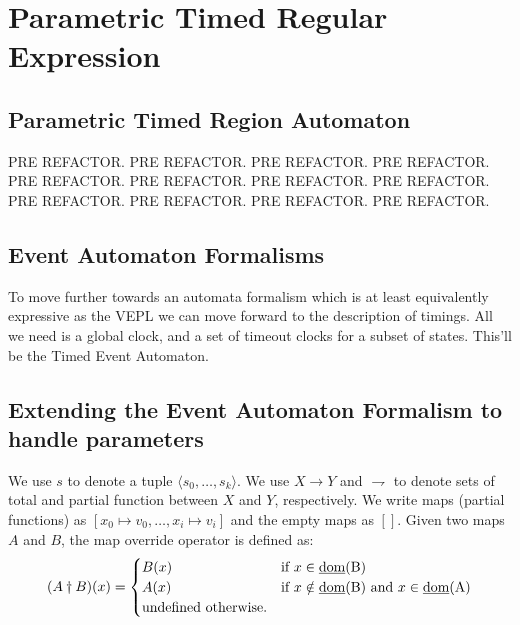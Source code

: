 	\section{Parametric Timed Regular Expression}
	
		\subsection{Parametric Timed Region Automaton}
					
			
		
		PRE REFACTOR. PRE REFACTOR. PRE REFACTOR. PRE REFACTOR. PRE REFACTOR. PRE REFACTOR. PRE REFACTOR. PRE REFACTOR. PRE REFACTOR. PRE REFACTOR. PRE REFACTOR. PRE REFACTOR. 

				
		\subsection{Event Automaton Formalisms}
		
			
			

			
			To move further towards an automata formalism which is at least equivalently expressive as the VEPL
			we can move forward to the description of timings. All we need is a global clock, and a set of timeout 
			clocks for a subset of states. This'll be the Timed Event Automaton.
		

		

			
		\subsection{Extending the Event Automaton Formalism to handle parameters}
			
		
			
			We use $s$ to denote a tuple $\langle s_0,\dots,s_k \rangle$. We use $X \rightarrow Y$ and $\rightharpoondown$ to denote sets of total and partial function between
			$X$ and $Y$, respectively. We write maps (partial functions) as $[x_0 \mapsto v_0,\dots,x_i \mapsto v_i]$ and the empty maps as $[]$. Given two maps $A$ and $B$,
			the map override operator is defined as:
				\[
				 (A \dagger B)(x) = 
				  \begin{cases} 
				   B(x) & \text{if } x \in \text{\underline{dom}(B)} \\
				   A(x) & \text{if } x \notin \text{\underline{dom}(B)} \text{ and } x \in \text{\underline{dom}(A)} \\
				   \text{undefined otherwise.}
				  \end{cases}
				\]
 			
